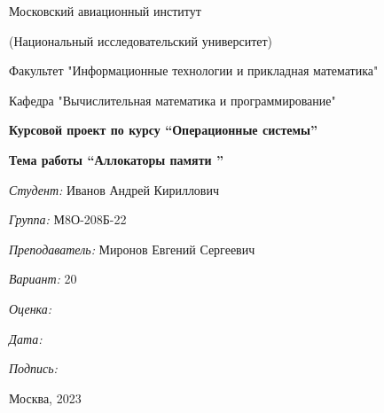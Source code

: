 \documentclass[a4paper, 12pt]{article}
\begin{document}
\thispagestyle{empty}	
\begin{center}
	Московский авиационный институт
	
	(Национальный исследовательский университет)
	
	Факультет "Информационные технологии и прикладная математика"
	
	Кафедра "Вычислительная математика и программирование"
	
\end{center}
\vspace{40ex}
\begin{center}
	\textbf{\large{Курсовой проект по курсу \linebreak \textquotedblleft Операционные системы\textquotedblright}}

    \vspace{1ex}    
    \textbf{\large{Тема работы \linebreak \textquotedblleft Аллокаторы памяти \textquotedblright}}
\end{center}
\vspace{29ex}
\begin{flushright}
	\textit{Студент: } Иванов Андрей Кириллович
	
	\vspace{2ex}
	\textit{Группа: } М8О-208Б-22
	
	\vspace{2ex}
	\textit{Преподаватель: } Миронов Евгений Сергеевич
	
	\vspace{2ex}
	\textit{Вариант: } 20
	
	\vspace{2ex}
	\textit{Оценка: } \underline{\quad\quad\quad\quad\quad\quad}
	
	 \vspace{2ex}
	\textit{Дата: } \underline{\quad\quad\quad\quad\quad\quad}
	
	\vspace{2ex}
	\textit{Подпись: } \underline{\quad\quad\quad\quad\quad\quad}
	
\end{flushright}

\vspace{5ex}

\begin{vfill}
	\begin{center}
		Москва, 2023
	\end{center}	
\end{vfill}
\newpage

\begingroup
\color{black}
\tableofcontents\newpage
\endgroup
\end{document}

